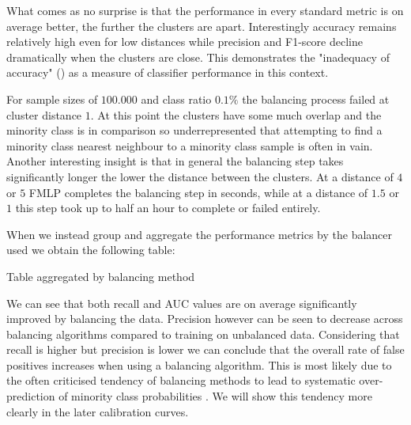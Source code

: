 What comes as no surprise is that the performance in every standard metric is on average better, the further the clusters are apart. 
Interestingly accuracy remains relatively high even for low distances while precision and F1-score decline dramatically when the clusters are close.
This demonstrates the "inadequacy of accuracy" (\cite{provost1997analysis}) as a measure of classifier performance in this context.

For sample sizes of $100.000$ and class ratio $0.1\%$ the balancing process failed at cluster distance $1$. 
At this point the clusters have some much overlap and the minority class is in comparison so underrepresented 
that attempting to find a minority class nearest neighbour to a minority class sample is often in vain.
Another interesting insight is that in general the balancing step takes significantly longer the lower the distance between the clusters.
At a distance of $4$ or $5$ FMLP completes the balancing step in seconds, while at a distance of $1.5$ or $1$ this step took up to half an hour to complete or failed entirely.

When we instead group and aggregate the performance metrics by the balancer used we obtain the following table:

\begin{table}[H]
\centering
\caption{Table aggregated by balancing method}
\end{table}

We can see that both recall and AUC values are on average significantly improved by balancing the data.
Precision however can be seen to decrease across balancing algorithms compared to training on unbalanced data.
Considering that recall is higher but precision is lower we can conclude that the overall rate of false positives increases when using a balancing algorithm.
This is most likely due to the often criticised tendency of balancing methods to lead to systematic over-prediction of minority class probabilities \cite{harm_imbalance}.
We will show this tendency more clearly in the later calibration curves.

